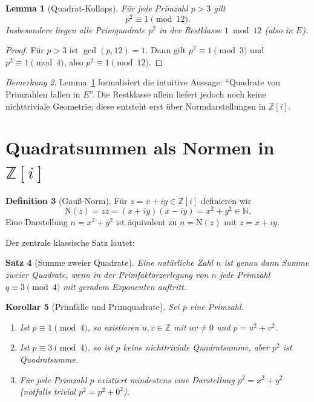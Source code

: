 \documentclass[a4paper,11pt]{article}
\newtheorem{satz}{Satz}[section]
\newtheorem{lemma}[satz]{Lemma}
\newtheorem{korollar}[satz]{Korollar}
\theoremstyle{definition}
\newtheorem{definition}[satz]{Definition}
\theoremstyle{remark}
\newtheorem{bemerkung}[satz]{Bemerkung}
\newcommand{\Z}{\mathbb{Z}}
\newcommand{\N}{\mathbb{N}}
\newcommand{\Zi}{\mathbb{Z}[i]}
\newcommand{\Norm}{\mathrm{N}}
\begin{document}
	\begin{lemma}[Quadrat-Kollaps]
		\label{lem:kollaps}
		Für jede Primzahl \(p>3\) gilt
		\[
		p^2\equiv 1\pmod{12}.
		\]
		Insbesondere liegen alle Primquadrate \(p^2\) in der Restklasse \(1\bmod 12\) (also in \(E\)).
	\end{lemma}
	
	\begin{proof}
		Für \(p>3\) ist \(\gcd(p,12)=1\). Dann gilt \(p^2\equiv 1\pmod{3}\) und \(p^2\equiv 1\pmod{4}\), also \(p^2\equiv 1\pmod{12}\).
	\end{proof}
	
	\begin{bemerkung}
		Lemma~\ref{lem:kollaps} formalisiert die intuitive Aussage: ``Quadrate von Primzahlen fallen in \(E\)''.
		Die Restklasse allein liefert jedoch noch keine nichttriviale Geometrie; diese entsteht erst über Normdarstellungen
		in \(\Zi\).
	\end{bemerkung}
	
	\section{Quadratsummen als Normen in \(\Zi\)}
	\begin{definition}[Gauß-Norm]
		Für \(z=x+iy\in\Zi\) definieren wir
		\[
		\Norm(z)=z\overline z=(x+iy)(x-iy)=x^2+y^2\in\N.
		\]
		Eine Darstellung \(n=x^2+y^2\) ist äquivalent zu \(n=\Norm(z)\) mit \(z=x+iy\).
	\end{definition}
	
	Der zentrale klassische Satz lautet:
	
	\begin{satz}[Summe zweier Quadrate]
		\label{thm:sos}
		Eine natürliche Zahl \(n\) ist genau dann Summe zweier Quadrate, wenn in der Primfaktorzerlegung von \(n\) jede
		Primzahl \(q\equiv 3\pmod4\) mit geradem Exponenten auftritt.
	\end{satz}
	
	\begin{korollar}[Primfälle und Primquadrate]
		\label{cor:primquad}
		Sei \(p\) eine Primzahl.
		\begin{enumerate}
			\item Ist \(p\equiv 1\pmod4\), so existieren \(u,v\in\Z\) mit \(uv\neq 0\) und \(p=u^2+v^2\).
			\item Ist \(p\equiv 3\pmod4\), so ist \(p\) keine nichttriviale Quadratsumme, aber \(p^2\) ist Quadratsumme.
			\item Für jede Primzahl \(p\) existiert mindestens eine Darstellung \(p^2=x^2+y^2\) (notfalls trivial \(p^2=p^2+0^2\)).
		\end{enumerate}
	\end{korollar}
	
\end{document}
